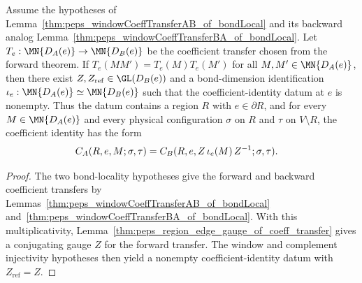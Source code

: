 \begin{lemma}
    \label{thm:peps_windowEdgeCoeffIdentityWitness_of_bondLocal}
    \leanok
    Assume the hypotheses of
    Lemma~\ref{thm:peps_windowCoeffTransferAB_of_bondLocal} and its
    backward analog
    Lemma~\ref{thm:peps_windowCoeffTransferBA_of_bondLocal}. Let
    $T_e:\MN{D_A(e)}\to\MN{D_B(e)}$ be the coefficient transfer chosen from
    the forward theorem. If $T_e(MM')=T_e(M)T_e(M')$ for all
    $M,M'\in\MN{D_A(e)}$, then there exist
    $Z,Z_{\mathrm{ref}}\in\GL(D_B(e))$ and a bond-dimension identification
    $\iota_e:\MN{D_A(e)}\simeq\MN{D_B(e)}$ such that the coefficient-identity
    datum at $e$ is nonempty. Thus the datum contains a region $R$ with
    $e\in\partial R$, and for every $M\in\MN{D_A(e)}$ and every physical
    configuration $\sigma$ on $R$ and $\tau$ on $V\setminus R$, the
    coefficient identity has the form
    \begin{align}
        C_A(R,e,M;\sigma,\tau)
         & =
        C_B(R,e,Z\,\iota_e(M)\,Z^{-1};\sigma,\tau). \notag
    \end{align}
\end{lemma}
\begin{proof}
    \leanok
    The two bond-locality hypotheses give the forward and backward coefficient
    transfers by
    Lemmas~\ref{thm:peps_windowCoeffTransferAB_of_bondLocal}
    and~\ref{thm:peps_windowCoeffTransferBA_of_bondLocal}. With this
    multiplicativity,
    Lemma~\ref{thm:peps_region_edge_gauge_of_coeff_transfer} gives a
    conjugating gauge $Z$ for the forward transfer. The window and complement
    injectivity hypotheses then yield a nonempty coefficient-identity datum
    with $Z_{\mathrm{ref}}=Z$.
\end{proof}
